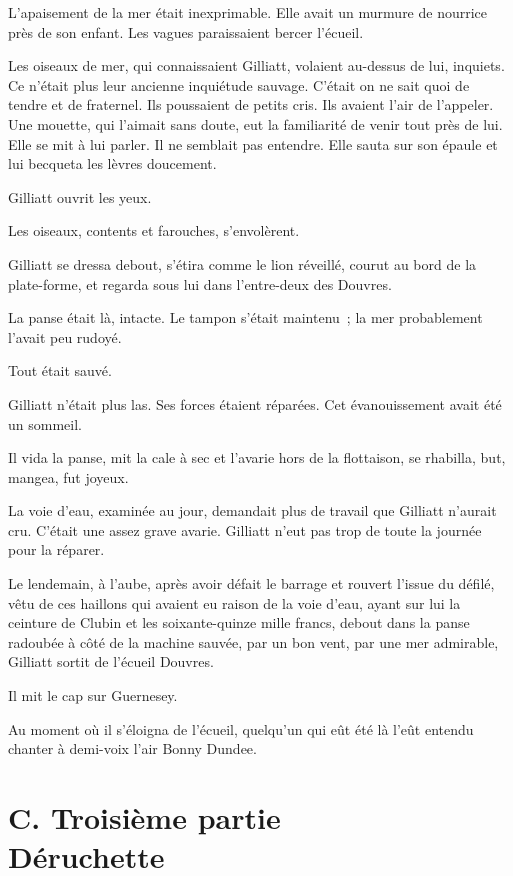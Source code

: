 \documentclass[french,twoside]{book} %
\begin{document}
L’apaisement de la mer était inexprimable. Elle avait un murmure de nourrice près de son enfant. Les vagues paraissaient bercer l’écueil.\par
Les oiseaux de mer, qui connaissaient Gilliatt, volaient au-dessus de lui, inquiets. Ce n’était plus leur ancienne inquiétude sauvage. C’était on ne sait quoi de tendre et de fraternel. Ils poussaient de petits cris. Ils avaient l’air de l’appeler. Une mouette, qui l’aimait sans doute, eut la familiarité de venir tout près de lui. Elle se mit à lui parler. Il ne semblait pas entendre. Elle sauta sur son épaule et lui becqueta les lèvres doucement.\par
Gilliatt ouvrit les yeux.\par
 Les oiseaux, contents et farouches, s’envolèrent.\par
Gilliatt se dressa debout, s’étira comme le lion réveillé, courut au bord de la plate-forme, et regarda sous lui dans l’entre-deux des Douvres.\par
La panse était là, intacte. Le tampon s’était maintenu ; la mer probablement l’avait peu rudoyé.\par
Tout était sauvé.\par
Gilliatt n’était plus las. Ses forces étaient réparées. Cet évanouissement avait été un sommeil.\par
Il vida la panse, mit la cale à sec et l’avarie hors de la flottaison, se rhabilla, but, mangea, fut joyeux.\par
La voie d’eau, examinée au jour, demandait plus de travail que Gilliatt n’aurait cru. C’était une assez grave avarie. Gilliatt n’eut pas trop de toute la journée pour la réparer.\par
Le lendemain, à l’aube, après avoir défait le barrage et rouvert l’issue du défilé, vêtu de ces haillons qui avaient eu raison de la voie d’eau, ayant sur lui la ceinture de Clubin et les soixante-quinze mille francs, debout dans la panse radoubée à côté de la machine sauvée, par un bon vent, par une mer admirable, Gilliatt sortit de l’écueil Douvres.\par
Il mit le cap sur Guernesey.\par
Au moment où il s’éloigna de l’écueil, quelqu’un qui eût été là l’eût entendu chanter à demi-voix l’air Bonny Dundee.
 \section[{C. Troisième partie. Déruchette}]{C. Troisième partie \\
Déruchette}\renewcommand{\leftmark}{C. Troisième partie \\
Déruchette}
\end{document}

